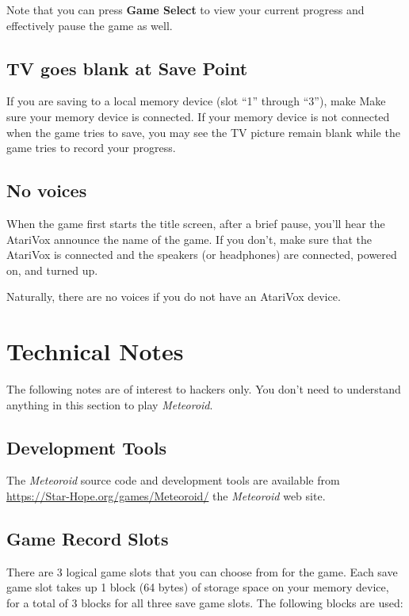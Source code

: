 \documentclass[10pt,twocolumn,openany,article]{memoir}
\begin{document}
Note  that you  can  press  \textbf{Game Select}  to  view your  current
progress and effectively pause the game as well.

\section{TV goes blank at Save Point}

\ifdefined\PLUSCART
If you are saving to a local memory device (slot ``1'' through ``3''), make
\else
Make
\fi
sure your memory device is  connected. If your memory device is not
connected when the game tries to save, you may see the TV picture remain
blank while the game tries to record your progress.

\section{No voices}

When the game first starts the title screen, after a brief pause, you'll
hear the AtariVox announce the name of the game. If you don't, make sure
that  the AtariVox  is connected  and the  speakers (or  headphones) are
connected, powered on, and turned up.

Naturally, there are no voices if you do not have an AtariVox device.

\fi

\chapter{Technical Notes}

The following notes are of interest to hackers only. You don't need to
understand anything in this section to play \textit{Meteoroid}.

\section{Development Tools}

The \textit{Meteoroid} source code and development tools are available from
\href{https://Star-Hope.org/games/Meteoroid/}{https://Star-Hope\-.org/\-games/\-Meteoroid/} 
the \textit{Meteoroid} web site.

\section{Game Record Slots}

There are 3  logical game slots that  you can choose from  for the game.
Each save game slot takes up 1 block (64 bytes) of storage space on your
memory device, for  a total of 3  blocks for all three  save game slots.
The following blocks are used:
\end{document}
